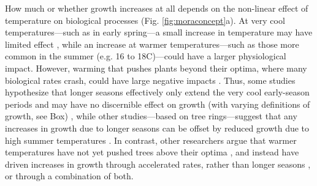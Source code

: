 \documentclass[11pt]{article}
\newcommand{\R}[1]{\label{#1}\linelabel{#1}}
\providecommand{\DIFdelbegin}{} %
\providecommand{\DIFdelend}{} %
\newcommand{\DIFscaledelfig}{0.5}
\newlength{\DIFdelgraphicswidth} %
\newlength{\DIFdelgraphicsheight} %
\newcommand{\DIFdelincludegraphics}[2][]{%
\sbox{\DIFdelgraphicsbox}{\DIFOincludegraphics[#1]{#2}}%
\settoboxwidth{\DIFdelgraphicswidth}{\DIFdelgraphicsbox} %
\settoboxtotalheight{\DIFdelgraphicsheight}{\DIFdelgraphicsbox} %
\scalebox{\DIFscaledelfig}{%
\parbox[b]{\DIFdelgraphicswidth}{\usebox{\DIFdelgraphicsbox}\\[-\baselineskip] \rule{\DIFdelgraphicswidth}{0em}}\llap{\resizebox{\DIFdelgraphicswidth}{\DIFdelgraphicsheight}{%
\setlength{\unitlength}{\DIFdelgraphicswidth}%
\begin{picture}(1,1)%
\thicklines\linethickness{2pt} %
{\color[rgb]{1,0,0}\put(0,0){\framebox(1,1){}}}%
{\color[rgb]{1,0,0}\put(0,0){\line( 1,1){1}}}%
{\color[rgb]{1,0,0}\put(0,1){\line(1,-1){1}}}%
\end{picture}%
}\hspace*{3pt}}} %
} %
\DeclareRobustCommand{\DIFdelbegin}{\DIFOdelbegin \let\includegraphics\DIFdelincludegraphics} %
\DeclareRobustCommand{\DIFdelend}{\DIFOaddend \let\includegraphics\DIFOincludegraphics} %
\begin{document}
How much or whether growth increases at all depends on the non-linear effect of temperature on biological processes (Fig. \ref{fig:moraconcept}a). At very cool temperatures---such as in early spring---a small increase in temperature may have limited effect \citep[or even increase frost risk through early budburst, Fig. \ref{fig:hypotheses}e,][]{cat2021pep}, while an increase at warmer temperatures---such as those more common in the summer (e.g. 16 to 18\degree C)---could have a larger physiological impact. However, warming that pushes plants beyond their optima, where many biological rates crash, could have large negative impacts \citep{nobel1983biophysical,leuning2002temperature}. Thus, some studies hypothesize that longer seasons effectively only extend the very cool early-season periods and may have no discernible effect on growth (with varying definitions of growth, see Box)\DIFdelbegin %
\DIFdelend , while other studies---based on tree rings---suggest that any increases in growth due to longer seasons can be offset by reduced growth due to high summer temperatures \citep[Fig. \ref{fig:hypotheses},][]{gantois2022new,dow2022warm}. In contrast, other researchers argue that warmer temperatures have not yet pushed trees above their optima \citep{schaber2002evaluation}, and instead have driven increases in growth through accelerated rates, rather than longer seasons \citep[e.g.][]{ren2019}, or through a combination of both.
\DIFdelbegin %
\DIFdelend 
\end{document}
